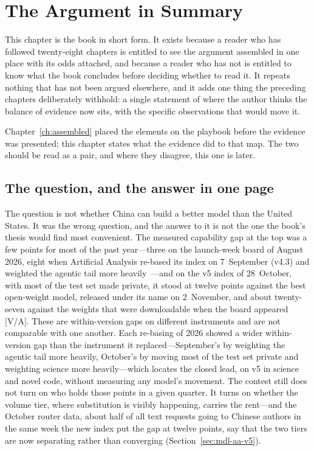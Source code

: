 \chapter{The Argument in Summary}
\label{ch:summary}

This chapter is the book in short form. It exists because a reader who has followed twenty-eight chapters is entitled to see the argument assembled in one place with its odds attached, and because a reader who has not is entitled to know what the book concludes before deciding whether to read it. It repeats nothing that has not been argued elsewhere, and it adds one thing the preceding chapters deliberately withhold: a single statement of where the author thinks the balance of evidence now sits, with the specific observations that would move it.

Chapter~\ref{ch:assembled} placed the elements on the playbook before the evidence was presented; this chapter states what the evidence did to that map. The two should be read as a pair, and where they disagree, this one is later.

\section{The question, and the answer in one page}
\label{sec:summary-answer}

The question is not whether China can build a better model than the United States. It was the wrong question, and the answer to it is not the one the book's thesis would find most convenient. The measured capability gap at the top was a few points for most of the past year---three on the launch-week board of August 2026, eight when Artificial Analysis re-based its index on 7~September (v4.3) and weighted the agentic tail more heavily~\cite{aa-v43}---and on the v5 index of 28~October, with most of the test set made private, it stood at twelve points against the best open-weight model, released under its name on 2~November, and about twenty-seven against the weights that were downloadable when the board appeared~\cite{mdl-aa-v5,lit-k31-weights} [V/A]. These are within-version gaps on different instruments and are not comparable with one another. Each re-basing of 2026 showed a wider within-version gap than the instrument it replaced---September's by weighting the agentic tail more heavily, October's by moving most of the test set private and weighting science more heavily---which locates the closed lead, on v5 in science and novel code, without measuring any model's movement. The contest still does not turn on who holds those points in a given quarter. It turns on whether the volume tier, where substitution is visibly happening, carries the rent---and the October router data, about half of all text requests going to Chinese authors in the same week the new index put the gap at twelve points, say that the two tiers are now separating rather than converging (Section~\ref{sec:mdl-aa-v5}).

